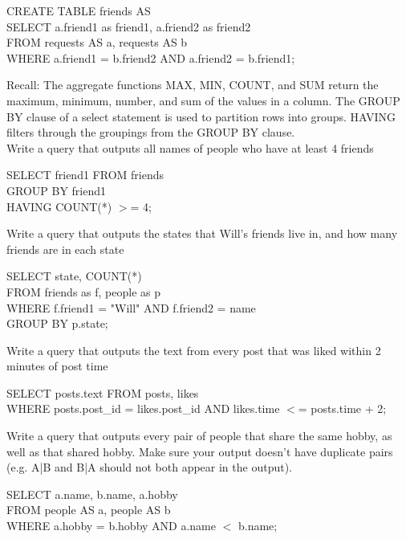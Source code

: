 \begin{solution}[0.5in]
CREATE TABLE friends AS\\
    SELECT a.friend1 as friend1, a.friend2 as friend2\\
    FROM requests AS a, requests AS b\\
    WHERE a.friend1 = b.friend2 AND a.friend2 = b.friend1;
\end{solution}

\question
Recall: The aggregate functions MAX, MIN, COUNT, and SUM return the maximum, minimum, number, and sum of the values in a column. The GROUP BY clause of a select statement is used to partition rows into groups. HAVING filters through the groupings from the GROUP BY clause.\\
Write a query that outputs all names of people who have at least 4 friends

\begin{solution}[0.5in]
SELECT friend1 FROM friends \\
GROUP BY friend1 \\
HAVING COUNT(*) $>$= 4;
\end{solution}

\question
Write a query that outputs the states that Will's friends live in, and how many friends are in each state

\begin{solution}[0.5in]
SELECT state, COUNT(*) \\
FROM friends as f, people as p\\
WHERE f.friend1 = "Will" AND f.friend2 = name \\
GROUP BY p.state;\\
\end{solution}

\question
Write a query that outputs the text from every post that was liked within 2 minutes of post time

\begin{solution}[0.5in]
SELECT posts.text FROM posts, likes\\
WHERE posts.post\_id = likes.post\_id AND likes.time $<$= posts.time + 2;
\end{solution}

\question
Write a query that outputs every pair of people that share the same hobby, as well as that shared hobby. Make sure your output doesn't have duplicate pairs (e.g. A|B and B|A should not both appear in the output).

\begin{solution}[0.5in]
SELECT a.name, b.name, a.hobby \\
FROM people AS a, people AS b\\
WHERE a.hobby = b.hobby AND a.name $<$ b.name;
\end{solution}

